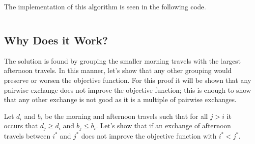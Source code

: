 \documentclass[11pt]{article}
\theoremstyle{definition}
\theoremstyle{remark}
\theoremstyle{remark}
\begin{document}
The implementation of this algorithm is seen in the following code.
\inputminted[frame=lines, linenos, firstline=51,
lastline=61]{cpp}{../src/bus-allocations.cpp}

\subsection{Why Does it Work?}

The solution is found by grouping the smaller morning travels with the largest
afternoon travels. In this manner, let's show that any other grouping would
preserve or worsen the objective function. For this proof it will be shown that
any pairwise exchange does not improve the objective function; this is enough to
show that any other exchange is not good as it is a multiple of pairwise
exchanges.

Let $d_{i}$ and $b_{i}$ be the morning and afternoon travels such that for all
$j > i$ it occurs that $d_{j} \ge d_{i}$ and $b_{j} \le b_{i}$. Let's show that
if an exchange of afternoon travels between $i^{*}$ and $j^{*}$ does not
improve the objective function with $i^{*} < j^{*}$.
\end{document}
